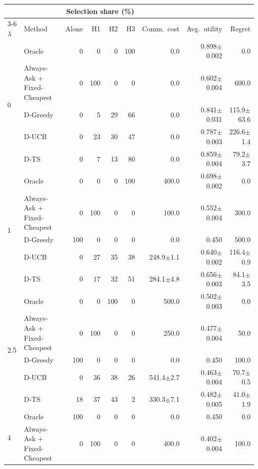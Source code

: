 \begin{tabular}{llrrrrrrr}
\toprule
 & & \multicolumn{4}{c}{Selection share (\%)} & & & \\
\cmidrule(lr){3-6}
$\lambda$ & Method & Alone & H1 & H2 & H3 & Comm.\ cost & Avg.\ utility & Regret \\
\midrule
\multirow{5}{*}{0} & Oracle & 0 & 0 & 0 & 100 & 0.0 & 0.898{\scriptsize$\pm$0.002} & 0.0 \\
 & Always-Ask + Fixed-Cheapest & 0 & 100 & 0 & 0 & 0.0 & 0.602{\scriptsize$\pm$0.004} & 600.0 \\
 & D-Greedy & 0 & 5 & 29 & 66 & 0.0 & 0.841{\scriptsize$\pm$0.031} & 115.9{\scriptsize$\pm$63.6} \\
 & D-UCB & 0 & 23 & 30 & 47 & 0.0 & 0.787{\scriptsize$\pm$0.003} & 226.6{\scriptsize$\pm$1.4} \\
 & D-TS & 0 & 7 & 13 & 80 & 0.0 & 0.859{\scriptsize$\pm$0.004} & 79.2{\scriptsize$\pm$3.7} \\
\midrule
\multirow{5}{*}{1} & Oracle & 0 & 0 & 0 & 100 & 400.0 & 0.698{\scriptsize$\pm$0.002} & 0.0 \\
 & Always-Ask + Fixed-Cheapest & 0 & 100 & 0 & 0 & 100.0 & 0.552{\scriptsize$\pm$0.004} & 300.0 \\
 & D-Greedy & 100 & 0 & 0 & 0 & 0.0 & 0.450 & 500.0 \\
 & D-UCB & 0 & 27 & 35 & 38 & 248.9{\scriptsize$\pm$1.1} & 0.640{\scriptsize$\pm$0.002} & 116.4{\scriptsize$\pm$0.9} \\
 & D-TS & 0 & 17 & 32 & 51 & 284.1{\scriptsize$\pm$4.8} & 0.656{\scriptsize$\pm$0.003} & 84.1{\scriptsize$\pm$3.5} \\
\midrule
\multirow{5}{*}{2.5} & Oracle & 0 & 0 & 100 & 0 & 500.0 & 0.502{\scriptsize$\pm$0.003} & 0.0 \\
 & Always-Ask + Fixed-Cheapest & 0 & 100 & 0 & 0 & 250.0 & 0.477{\scriptsize$\pm$0.004} & 50.0 \\
 & D-Greedy & 100 & 0 & 0 & 0 & 0.0 & 0.450 & 100.0 \\
 & D-UCB & 0 & 36 & 38 & 26 & 541.4{\scriptsize$\pm$2.7} & 0.463{\scriptsize$\pm$0.004} & 70.7{\scriptsize$\pm$0.5} \\
 & D-TS & 18 & 37 & 43 & 2 & 330.3{\scriptsize$\pm$7.1} & 0.482{\scriptsize$\pm$0.005} & 41.0{\scriptsize$\pm$1.9} \\
\midrule
\multirow{5}{*}{4} & Oracle & 100 & 0 & 0 & 0 & 0.0 & 0.450 & 0.0 \\
 & Always-Ask + Fixed-Cheapest & 0 & 100 & 0 & 0 & 400.0 & 0.402{\scriptsize$\pm$0.004} & 100.0 \\

\end{tabular}
